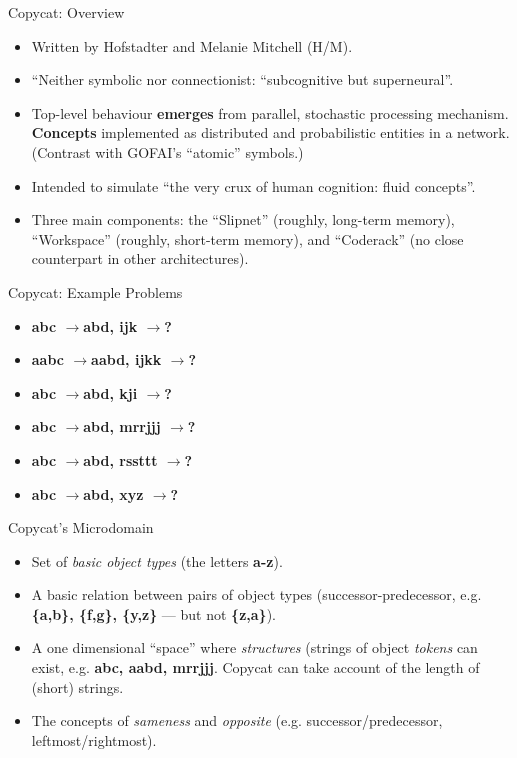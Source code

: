 \documentclass{article}
\begin{document}
\begin{slide}
{\Large Copycat: Overview}
\begin{itemize}
\item Written by Hofstadter and Melanie Mitchell (H/M).
\item ``Neither symbolic nor connectionist: ``subcognitive but superneural''.
\item Top-level behaviour {\bf emerges} from parallel, stochastic
processing mechanism. {\bf Concepts} implemented as distributed and
probabilistic entities in a network. (Contrast with GOFAI's ``atomic''
symbols.)
\item Intended to simulate ``the very crux of human cognition: fluid
concepts''.
\item Three main components: the ``Slipnet'' (roughly, long-term
memory), ``Workspace'' (roughly, short-term memory), and
``Coderack'' (no close counterpart in other architectures). 
\end{itemize}
\end{slide}

\begin{slide}{}
{\Large Copycat: Example Problems}
\begin{itemize}
\item {\bf abc $\rightarrow$\space abd, ijk  $\rightarrow$?}
\item {\bf aabc $\rightarrow$\space aabd, ijkk $\rightarrow$\space ?}
\item {\bf abc $\rightarrow$\space abd, kji $\rightarrow$\space ?}
\item {\bf abc $\rightarrow$\space abd, mrrjjj $\rightarrow$\space ?}
\item {\bf abc $\rightarrow$\space abd, rssttt $\rightarrow$\space ?}
\item {\bf abc $\rightarrow$\space abd, xyz $\rightarrow$\space ?}
\end{itemize}
\end{slide}

\begin{slide}
{\Large Copycat's Microdomain}
\begin{itemize}
\item Set of {\em basic object types} (the letters {\bf a-z}).
\item A basic relation between pairs of object types
(successor-predecessor, e.g. {\bf \{a,b\}, \{f,g\}, \{y,z\}} --- but
not {\bf \{z,a\}}).
\item A one dimensional ``space'' where {\em structures} (strings of
object {\em tokens} can exist, e.g. {\bf abc, aabd, mrrjjj}. Copycat
can take account of the length of (short) strings.
\item The concepts of {\em sameness} and {\em opposite}
(e.g. successor/predecessor,\\leftmost/rightmost).
\end{itemize}
\end{slide}
\end{document}
